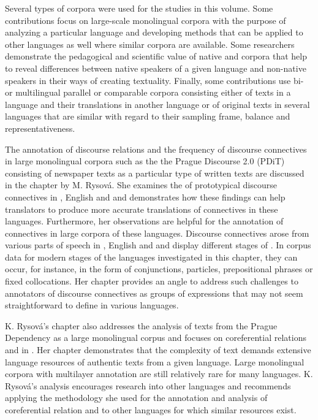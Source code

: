 \documentclass[output=paper]{langsci/langscibook.cls}
\begin{document}
	Several types of corpora were used for the studies in this volume. Some contributions focus on large-scale monolingual corpora with the purpose of analyzing a particular language and developing methods that can be applied to other languages as well where similar corpora are available. Some researchers demonstrate the pedagogical and scientific value of native and  corpora that help to reveal differences between native speakers of a given language and non-native speakers in their ways of creating textuality. Finally, some contributions use bi- or multilingual parallel or comparable corpora consisting either of texts in a language and their translations in another language or of original texts in several languages that are similar with regard to their sampling frame, balance and representativeness.	
	
	The annotation of discourse relations and the frequency of discourse connectives in large monolingual corpora such as the the Prague Discourse  2.0 (PDiT) consisting of  newspaper texts as a particular type of written texts are discussed in the chapter by M. Rysov\'{a}. She examines the  of prototypical discourse connectives in , English and  and demonstrates how these findings can help translators to produce more accurate translations of connectives in these languages. Furthermore, her observations are helpful for the annotation of connectives in large corpora of these languages. Discourse connectives arose from various parts of speech in , English and  and display different stages of . In corpus data for modern stages of the languages investigated in this chapter, they can occur, for instance, in the form of conjunctions, particles, prepositional phrases or fixed collocations. Her chapter provides an angle to address such challenges to annotators of discourse connectives as groups of expressions that may not seem straightforward to define in various languages.
	
	K. Rysov\'{a}'s chapter also addresses the analysis of texts from the Prague Dependency  as a large monolingual corpus and focuses on coreferential relations and  in . Her chapter demonstrates that the complexity of text  demands extensive language resources of authentic texts from a given language. Large monolingual corpora with multilayer annotation are still relatively rare for many languages. K. Rysov\'{a}'s analysis encourages research into other languages and recommends applying the methodology she used for the annotation and analysis of coreferential relation and  to other languages for which similar resources exist.
	
\end{document}
